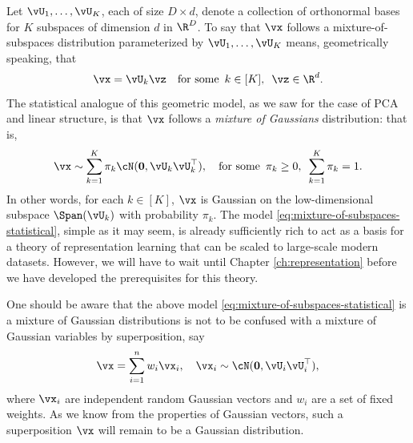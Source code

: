\documentclass[../../book-main.tex]{subfiles}
\begin{document}
Let $\vU_1, \dots, \vU_K$, each of size $D \times d$, denote a collection of orthonormal bases for $K$ subspaces of dimension $d$ in $\R^D$.
To say that $\vx$ follows a mixture-of-subspaces distribution parameterized by $\vU_1, \dots, \vU_K$ means, geometrically speaking,
that 
\begin{equation}\label{eq:mixture-of-subspaces-geometric}
    \vx = \vU_k \vz  \quad \text{for some} \enspace k \in [K],\enspace \vz \in \R^d.
\end{equation}
The statistical analogue of this geometric model, as we saw for the case of PCA and linear structure,
is that $\vx$ follows a \textit{mixture of Gaussians} distribution: that is,
\begin{equation}\label{eq:mixture-of-subspaces-statistical}
    \vx \sim \sum_{k=1}^K \pi_k \cN(\mathbf{0}, \vU_k\vU_k^\top), \quad \text{for some} \enspace \pi_k \geq 0,\enspace \sum_{k=1}^K \pi_k = 1.
\end{equation}
In other words, for each $k \in [K]$, $\vx$ is Gaussian on the low-dimensional subspace $\Span(\vU_k)$  with probability $\pi_k$.
The model \eqref{eq:mixture-of-subspaces-statistical}, simple as it may seem, is already sufficiently rich to act as a basis for a theory of representation learning that can be scaled to large-scale modern datasets. However, we will have to wait until Chapter \ref{ch:representation} before we have developed the prerequisites for this theory. 

\begin{remark}
One should be aware that the above model \eqref{eq:mixture-of-subspaces-statistical} is a mixture of Gaussian distributions is not to be confused with a mixture of Gaussian variables by superposition, say 
\begin{equation}
    \vx = \sum_{i=1}^n w_i \vx_i, \quad \vx_i \sim \cN(\mathbf{0}, \vU_i\vU_i^\top),
\end{equation}
where $\vx_i$ are independent random Gaussian vectors and $w_i$ are a set of fixed weights. As we know from the properties of Gaussian vectors, such a superposition $\vx$ will remain to be a Gaussian distribution.
\end{remark}
\end{document}
